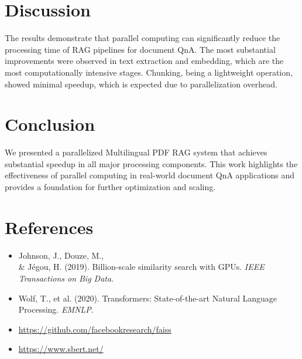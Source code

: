\documentclass[11pt,a4paper]{article}
\begin{document}
\section{Discussion}
The results demonstrate that parallel computing can significantly reduce the processing time of RAG pipelines for document QnA. The most substantial improvements were observed in text extraction and embedding, which are the most computationally intensive stages. Chunking, being a lightweight operation, showed minimal speedup, which is expected due to parallelization overhead.

\section{Conclusion}
We presented a parallelized Multilingual PDF RAG system that achieves substantial speedup in all major processing components. This work highlights the effectiveness of parallel computing in real-world document QnA applications and provides a foundation for further optimization and scaling.

\section{References}
\begin{itemize}
    \item Johnson, J., Douze, M., \\& Jégou, H. (2019). Billion-scale similarity search with GPUs. \textit{IEEE Transactions on Big Data}.
    \item Wolf, T., et al. (2020). Transformers: State-of-the-art Natural Language Processing. \textit{EMNLP}.
    \item \url{https://github.com/facebookresearch/faiss}
    \item \url{https://www.sbert.net/}
\end{itemize}
\end{document}
